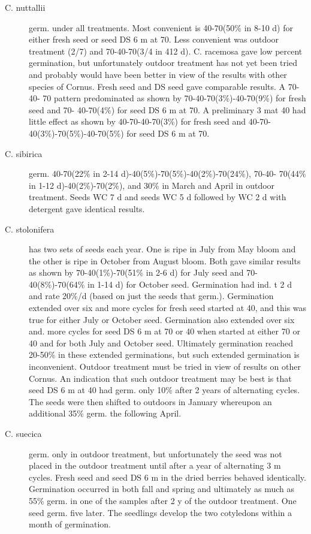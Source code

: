 \begin{description}
\item [C. nuttallii] germ. under all treatments. Most convenient is 40-70(50\% in 8-10 d)
for either fresh seed or seed DS 6 m at 70. Less convenient was outdoor treatment
(2/7) and 70-40-70(3/4 in 412 d).
C. racemosa gave low percent germination, but unfortunately outdoor treatment
has not yet been tried and probably would have been better in view of the results with
other species of Cornus. Fresh seed and DS seed gave comparable results. A 70-40-
70 pattern predominated as shown by 70-40-70(3\%)-40-70(9\%) for fresh seed and 70-
40-70(4\%) for seed DS 6 m at 70. A preliminary 3 mat 40 had little effect as shown by
40-70-40-70(3\%) for fresh seed and 40-70-40(3\%)-70(5\%)-40-70(5\%) for seed DS 6
m at 70.
\item [C. sibirica] germ. 40-70(22\% in 2-14 d)-40(5\%)-70(5\%)-40(2\%)-70(24\%), 70-40-
70(44\% in 1-12 d)-40(2\%)-70(2\%), and 30\% in March and April in outdoor treatment.
Seeds WC 7 d and seeds WC 5 d followed by WC 2 d with detergent gave identical
results.
\item [C. stolonifera] has two sets of seeds each year. One is ripe in July from May
bloom and the other is ripe in October from August bloom. Both gave similar results as
shown by 70-40(1\%)-70(51\% in 2-6 d) for July seed and 70-40(8\%)-70(64\% in 1-14 d)
for October seed. Germination had ind. t 2 d and rate 20\%/d (based on just the seeds
that germ.). Germination extended over six and more cycles for fresh seed started at
40, and this was true for either July or October seed. Germination also extended over
six and. more cycles for seed DS 6 m at 70 or 40 when started at either 70 or 40 and for
both July and October seed. Ultimately germination reached 20-50\% in these
extended germinations, but such extended germination is inconvenient. Outdoor
treatment must be tried in view of results on other Cornus. An indication that such
outdoor treatment may be best is that seed DS 6 m at 40 had germ. only 10\% after 2
years of alternating cycles. The seeds were then shifted to outdoors in January
whereupon an additional 35\% germ. the following April.
\item [C. suecica] germ. only in outdoor treatment, but unfortunately the seed was not
placed in the outdoor treatment until after a year of alternating 3 m cycles. Fresh seed
and seed DS 6 m in the dried berries behaved identically. Germination occurred in
both fall and spring and ultimately as much as 55\% germ. in one of the samples after 2
y of the outdoor treatment. One seed germ. five later. The seedlings develop the two
cotyledons within a month of germination.


\end{description}
